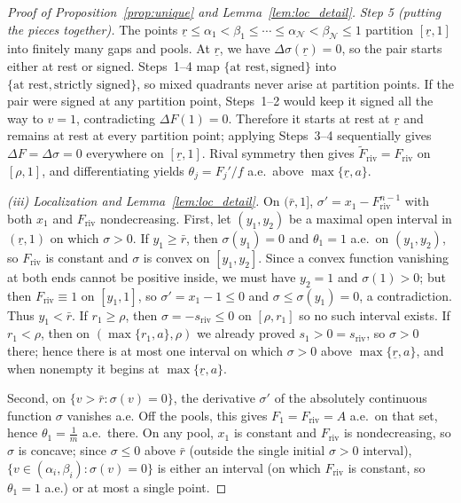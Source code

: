 \documentclass[12pt]{article}
\theoremstyle{mystyle}
\theoremstyle{mystyle2}
\newcommand{\1}{\mathbf{1}}
\begin{document}
\begin{proof}[Proof of Proposition~\ref{prop:unique} and Lemma~\ref{lem:loc_detail}]
\emph{Step 5 (putting the pieces together).} The points $\underline r\le\alpha_1<\beta_1\le\cdots\le\alpha_{\mathcal N}<\beta_{\mathcal N}\le 1$ partition $[\underline r,1]$ into finitely many gaps and pools. At $\underline r$, we have $\Delta\sigma(\underline r)=0$, so the pair starts either at rest or signed. Steps~1--4 map $\{\text{at rest},\text{signed}\}$ into $\{\text{at rest},\text{strictly signed}\}$, so mixed quadrants never arise at partition points. If the pair were signed at any partition point, Steps~1--2 would keep it signed all the way to $v=1$, contradicting $\Delta F(1)=0$. Therefore it starts at rest at $\underline r$ and remains at rest at every partition point; applying Steps~3--4 sequentially gives $\Delta F=\Delta\sigma=0$ everywhere on $[\underline r,1]$. Rival symmetry then gives $\tilde F_{\mathrm{riv}}=F_{\mathrm{riv}}$ on $[\rho,1]$, and differentiating yields $\theta_j=F_j'/f$ a.e.\ above $\max\{\underline r,a\}$.

\emph{(iii) Localization and Lemma~\ref{lem:loc_detail}.} On $(\bar r,1]$, $\sigma'=x_1-F_{\mathrm{riv}}^{n-1}$ with both $x_1$ and $F_{\mathrm{riv}}$ nondecreasing.
First, let $(y_1,y_2)$ be a maximal open interval in $(\underline r,1)$ on which $\sigma>0$. If $y_1\ge\bar r$, then $\sigma(y_1)=0$ and $\theta_1=1$ a.e.\ on $(y_1,y_2)$, so $F_{\mathrm{riv}}$ is constant and $\sigma$ is convex on $[y_1,y_2]$. Since a convex function vanishing at both ends cannot be positive inside, we must have $y_2=1$ and $\sigma(1)>0$; but then $F_{\mathrm{riv}}\equiv 1$ on $[y_1,1]$, so $\sigma'=x_1-1\le 0$ and $\sigma\le\sigma(y_1)=0$, a contradiction. Thus $y_1<\bar r$. If $r_1\ge\rho$, then $\sigma=-s_{\mathrm{riv}}\le 0$ on $[\rho,r_1]$ so no such interval exists. If $r_1<\rho$, then on $(\max\{r_1,a\},\rho)$ we already proved $s_1>0=s_{\mathrm{riv}}$, so $\sigma>0$ there; hence there is at most one interval on which $\sigma>0$ above $\max\{\underline r,a\}$, and when nonempty it begins at $\max\{\underline r,a\}$.

Second, on $\{v>\bar r:\sigma(v)=0\}$, the derivative $\sigma'$ of the absolutely continuous function $\sigma$ vanishes a.e. Off the pools, this gives $F_1=F_{\mathrm{riv}}=A$ a.e.\ on that set, hence $\theta_1=\frac{1}{m}$ a.e.\ there. On any pool, $x_1$ is constant and $F_{\mathrm{riv}}$ is nondecreasing, so $\sigma$ is concave; since $\sigma\le 0$ above $\bar r$ (outside the single initial $\sigma>0$ interval), $\{v\in(\alpha_i,\beta_i):\sigma(v)=0\}$ is either an interval (on which $F_{\mathrm{riv}}$ is constant, so $\theta_1=1$ a.e.) or at most a single point.


\end{proof}
\end{document}
